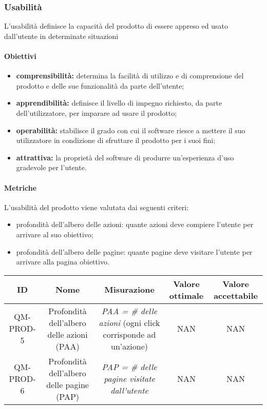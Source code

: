 \subsubsection{Usabilità}
L'usabilità definisce la capacità del prodotto di essere appreso ed usato dall'utente in determinate situazioni
	\paragraph{Obiettivi}
		\begin{itemize}
			\item \textbf{comprensibilità:} determina la facilità di utilizzo e di comprensione del prodotto e delle sue funzionalità da parte dell'utente;
			\item \textbf{apprendibilità:} definisce il livello di impegno richiesto, da parte dell'utilizzatore, per imparare ad usare il prodotto;
			\item \textbf{operabilità:} stabilisce il grado con cui il software riesce a mettere il suo utilizzatore in condizione di sfruttare il prodotto per i suoi fini;
			\item \textbf{attrattiva:} la proprietà del software di produrre un'esperienza d'uso gradevole per l'utente.
		\end{itemize}
	\paragraph{Metriche}
	L'usabilità del prodotto viene valutata dai seguenti criteri:
	\begin{itemize}
		\item profondità dell'albero delle azioni: quante azioni deve compiere l'utente per arrivare al suo obiettivo;
		\item profondità dell'albero delle pagine: quante pagine deve visitare l'utente per arrivare alla pagina obiettivo.
	\end{itemize}
	\begin{center}
		\begin{tabular}{|c|c|c|c|c|}
			\hline
			ID & Nome & Misurazione & Valore ottimale & Valore accettabile \\
			\hline
			QM-PROD-5 & Profondità dell'albero delle azioni (PAA) & \textit{PAA = \# delle azioni} (ogni click corrisponde ad un'azione) & NAN & NAN \\
			\hline
			QM-PROD-6 & Profondità dell'albero delle pagine (PAP) & \textit{PAP = \# delle pagine visitate dall'utente} & NAN & NAN \\
			\hline
		\end{tabular}
	\end{center}
